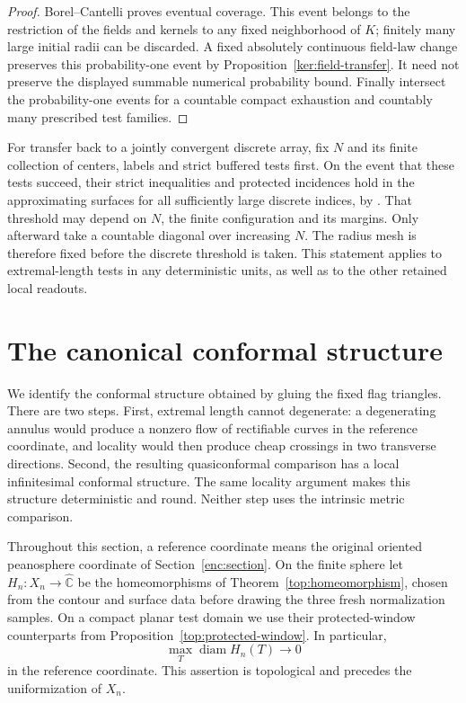 \documentclass[11pt]{article}
\numberwithin{equation}{section}
\theoremstyle{definition}
\theoremstyle{remark}
\newcommand{\Chat}{\widehat{\mathbb C}}
\newcommand{\1}{\mathbf 1}
\DeclareMathOperator{\diam}{diam}
\begin{document}
\begin{proof}
Borel--Cantelli proves eventual coverage.  This event belongs to
the restriction of the fields and kernels to any fixed neighborhood
of \(K\); finitely many large initial radii can be discarded.
A fixed absolutely continuous field-law change preserves this
probability-one event by Proposition~\ref{ker:field-transfer}.
It need not preserve the displayed summable numerical probability
bound.  Finally intersect the probability-one events for a countable
compact exhaustion and countably many prescribed test families.
\end{proof}

For transfer back to a jointly convergent discrete array, fix \(N\)
and its finite collection of centers, labels and strict buffered tests
first. On the event that these tests succeed, their strict inequalities
and protected incidences hold in the approximating surfaces for all
sufficiently large discrete indices, by
. That threshold may depend on
\(N\), the finite configuration and its margins. Only afterward take a
countable diagonal over increasing \(N\). The radius mesh is therefore
fixed before the discrete threshold is taken. This statement applies
to extremal-length tests in any deterministic units, as well as to the
other retained local readouts.

\section{The canonical conformal structure}
\label{conf:section}

We identify the conformal structure obtained by gluing the fixed flag
triangles.  There are two steps.  First, extremal length cannot degenerate:
a degenerating annulus would produce a nonzero flow of rectifiable curves
in the reference coordinate, and locality would then produce cheap
crossings in two transverse directions.  Second, the resulting
quasiconformal comparison has a local infinitesimal conformal structure.
The same locality argument makes this structure deterministic and round.
Neither step uses the intrinsic metric comparison.

Throughout this section, a reference coordinate means the original
oriented peanosphere coordinate of Section~\ref{enc:section}.  On the
finite sphere let
\(H_n:X_n\to\Chat\) be the homeomorphisms of
Theorem~\ref{top:homeomorphism}, chosen from the contour and surface
data before drawing the three fresh normalization samples.  On a compact
planar test domain we use their protected-window counterparts from
Proposition~\ref{top:protected-window}.  In particular,
\begin{equation}
 \max_T\diam H_n(T)\longrightarrow0
 \label{conf:topological-mesh}
\end{equation}
in the reference coordinate.  This assertion is topological and precedes
the uniformization of \(X_n\).
\end{document}
